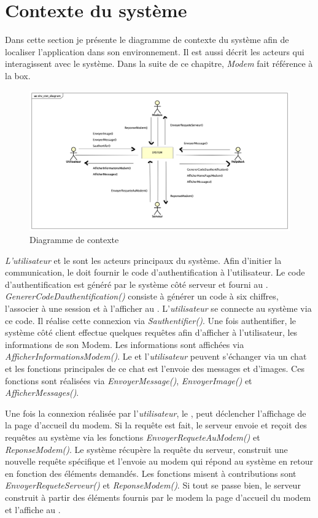 \section{Contexte du système}
Dans cette section je présente le diagramme de contexte du système afin de localiser l'application dans son environnement. Il est aussi décrit les acteurs qui interagissent avec le système. Dans la suite de ce chapitre, \textit{Modem} fait référence à la box.
\begin{figure}[H]
	\centering
	\includegraphics[scale=0.4]{assets/images/shv_ctxt.png}
	\caption{Diagramme de contexte}
	\label{fig.3}
\end{figure} 

\emph{L'utilisateur} et le \hd sont les acteurs principaux du système. Afin d'initier la communication, le \hd doit fournir le code d'authentification à l'utilisateur. Le code d'authentification est généré par le système côté serveur et fourni au \hd. \textit{GenererCodeDauthentification()} consiste à générer un code à six chiffres, l'associer à une session et à l'afficher au \hd. L'\emph{utilisateur} se connecte au système via ce code. Il réalise cette connexion via \textit{Sauthentifier()}. Une fois authentifier, le système côté client effectue quelques requêtes afin d'afficher à l'utilisateur, les informations de son Modem. Les informations sont affichées via \textit{AfficherInformationsModem()}. Le \hd et l'\emph{utilisateur} peuvent s'échanger via un chat et les fonctions principales de ce chat est l'envoie des messages et d'images. Ces fonctions sont réalisées via \textit{EnvoyerMessage()}, \textit{EnvoyerImage()} et \textit{AfficherMessages()}.

 Une fois la connexion réalisée par l'\emph{utilisateur}, le \hd, peut déclencher l'affichage de la page d'accueil du modem. Si la requête est fait, le serveur envoie et reçoit des requêtes au système via les fonctions \textit{EnvoyerRequeteAuModem()} et \textit{ReponseModem()}. Le système récupère la requête du serveur, construit une nouvelle requête spécifique et l'envoie au modem qui répond au système en retour en fonction des éléments demandés. Les fonctions misent à contributions sont \textit{EnvoyerRequeteServeur()} et \textit{ReponseModem()}. Si tout se passe bien, le serveur construit à partir des éléments fournis par le modem la page d'accueil du modem et l'affiche au \hd.
 
